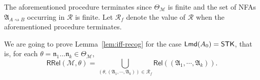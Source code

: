 \documentclass[preprint,12pt]{elsarticle}
\newcommand\Mm{{\mathcal{M} }}
\newcommand\Pp{{\mathcal{P} }}
\newcommand\act{{\sf Act}}
\newcommand\lmd{{\sf Lmd}}
\newcommand\singletask{{\sf STK}}
\newcommand\confs{{\mathsf{Confs} }}
\newcommand\conf{{\mathsf{Conf} }}
\newcommand\aname{\mathfrak{n}}
\newcommand\AutReach{\mathscr{R}}
\newcommand\RLang{\mathsf{RRel}}
\newcommand\Rel{\mathsf{Rel}}
\newcommand{\STK}{\mathsf{STK}}
\newcommand\Aut{{\mathfrak{A} }}
\newcommand\Lang{{\mathscr{L} }}
\newcommand\ConfSet{{\mathscr{C} }}
\newcommand{\NFA}{\textsf{NFA}}
\newcommand\topact{\mathsf{Top}}
\begin{document}
The aforementioned procedure terminates since $\Theta_\Mm$ is finite and the set of {\NFA}s $\Aut_{A\rightsquigarrow B}$ occurring in $\AutReach$ is finite.
Let $\AutReach_f$ denote the value of $\AutReach$ when the aforementioned procedure terminates. 










We are going to prove Lemma~\ref{lem:iff-recog} for the case $\lmd(A_0) = \singletask$, that is, for each $\theta=\aname_1\dots\aname_k\in\Theta_{\Mm}$, 
%
\[\RLang(\Mm, \theta) = \bigcup \limits_{(\theta, (\Aut_1, \cdots, \Aut_k)) \in \AutReach_f} \Rel((\Aut_1, \cdots, \Aut_k)).\]
\end{document}
